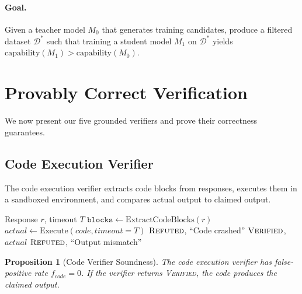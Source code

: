 \documentclass[11pt,a4paper]{article}
\newtheorem{proposition}[theorem]{Proposition}
\newcommand{\calD}{\mathcal{D}}
\begin{document}
\paragraph{Goal.} Given a teacher model $M_0$ that generates training candidates, produce a filtered dataset $\calD^*$ such that training a student model $M_1$ on $\calD^*$ yields $\text{capability}(M_1) > \text{capability}(M_0)$.

\section{Provably Correct Verification}
\label{sec:verification}

We now present our five grounded verifiers and prove their correctness guarantees.

\subsection{Code Execution Verifier}
\label{sec:code}

The code execution verifier extracts code blocks from responses, executes them in a sandboxed environment, and compares actual output to claimed output.

\begin{algorithm}
\caption{Code Execution Verification}
\label{alg:code}
\begin{algorithmic}[1]
\Require Response $r$, timeout $T$
\State $\texttt{blocks} \gets \text{ExtractCodeBlocks}(r)$
    \State $actual \gets \text{Execute}(code, timeout=T)$
        \State \Return $\textsc{Refuted}$, ``Code crashed''
        \State \Return $\textsc{Verified}$, $actual$
    \Else
        \State \Return $\textsc{Refuted}$, ``Output mismatch''
    \EndIf
\EndFor
\end{algorithmic}
\end{algorithm}

\begin{proposition}[Code Verifier Soundness]
\label{prop:code}
The code execution verifier has false-positive rate $f_{code} = 0$. If the verifier returns \textsc{Verified}, the code produces the claimed output.
\end{proposition}
\end{document}
